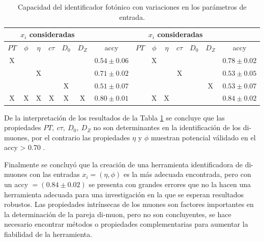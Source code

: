 \begin{table}[!h]
\footnotesize
\centering
\begin{tabular}{|cccccc|c||cccccc|c|}
\toprule
\multicolumn{6}{|c|}{$x_i$ consideradas} &  &
\multicolumn{6}{|c|}{$x_i$ consideradas} &  \\
\midrule
$PT$ & $\phi$ & $\eta$ & $c\tau$ & $D_0$ & $D_Z$  & \textsf{accy} &
$PT$ & $\phi$ & $\eta$ & $c\tau$ & $D_0$ & $D_Z$  & \textsf{accy} \\
\midrule
X &  &  &  &  &  & $0.54 \pm 0.06$ &
 & X &  &  &  &  & $0.78 \pm 0.02$\\
 &  & X &  &  &  & $0.71 \pm 0.02$ &
 &  &  & X &  &  & $0.53 \pm 0.05$\\
 &  &  &  & X &  & $0.51 \pm 0.07$ &
 &  &  &  &  & X & $0.53 \pm 0.07$\\
\bottomrule
X & X & X & X & X & X & $0.80 \pm 0.01$ &
 & X & X &  &  &  & $0.84 \pm 0.02$\\
\bottomrule 
\end{tabular}%
\caption{Capacidad del identificador fotónico con variaciones en los parámetros de entrada.}
\label{ajuste1}
\end{table}

De la interpretación de los resultados de la Tabla \ref{ajuste1} se concluye que las propiedades $PT, ~ c\tau, ~ D_0, ~D_Z$ no son determinantes en la identificación de los di-muones, por el contrario las propiedades $\eta$ y $\phi$ muestran potencial válidado en el \textsf{accy} > 0.70 . 

Finalmente se concluyó que la creación de una herramienta identificadora de di-muones con las entradas $x_i=(\eta,\phi)$ es la más adecuada encontrada, pero con un \textsf{accy} $= (0.84 \pm 0.02)$ se presenta con grandes errores que no la hacen una herramienta adecuada para una investigación en la que se esperan resultados robustos. 
Las propiedades intrínsecas de los muones son factores importantes en la determinación de la pareja di-muon, pero no son concluyentes, se hace necesario encontrar métodos o propiedades complementarias para aumentar la fiabilidad de la herramienta.














